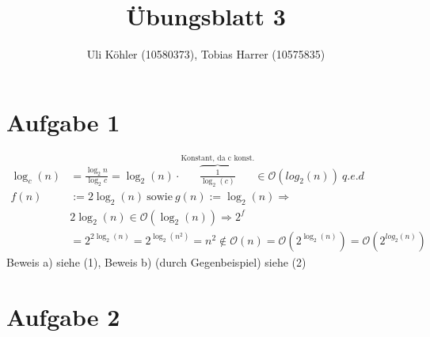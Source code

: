 \documentclass[a4paper,10pt,oneside,leqno]{scrartcl}
\title{Übungsblatt 3}
\author{Uli Köhler (10580373), Tobias Harrer (10575835)}
\begin{document}
\maketitle

\section*{Aufgabe 1}
\renewcommand{\theequation}{\alph{equation}}
\begin{align}
  \log_{c}(n) &= \frac{\log_{2}{n}}{\log_{2}{c}} = \log_2(n)\cdot\overbrace{\frac{1}{\log_2(c)}}^{\text{Konstant, da c konst.}} \in \mathcal{O}(log_2(n))\ q.e.d\\
  f(n) &:= 2\log_2(n)\ \text{sowie}\ g(n) := \log_2(n) \Longrightarrow\\
  &2\log_2(n) \in \mathcal{O}(\log_2(n)) \Longrightarrow 2^{f}\nonumber\\
  &=2^{2\log_2(n)}=2^{\log_2(n^2)}=n^2 \notin \mathcal{O}(n) = \mathcal{O}(2^{\log_2(n)}) = \mathcal{O}(2^{log_2(n)})\nonumber
\end{align}
Beweis a) siehe (1), Beweis b) (durch Gegenbeispiel) siehe (2)
\section*{Aufgabe 2} \setcounter{equation}{1}
\end{document}
